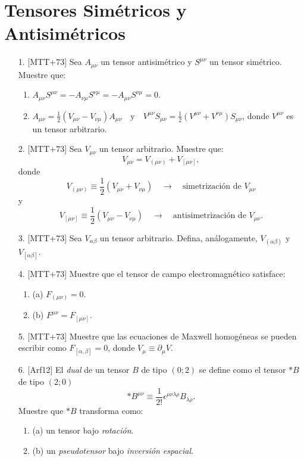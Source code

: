 \documentclass[a4paper,12pt]{article}
\begin{document}
\section*{Tensores Simétricos y Antisimétricos}

\begin{enumerate}
    \item [1.] [MTT+73] Sea $A_{\mu\nu}$ un tensor antisimétrico y $S^{\mu\nu}$ un tensor simétrico. Muestre que:
    \begin{enumerate}
        \item $A_{\mu\nu} S^{\mu\nu} = -A_{\nu\mu} S^{\nu\mu} = -A_{\mu\nu} S^{\nu\mu} = 0$.
        \item $A_{\mu\nu} = \frac{1}{2} (V_{\mu\nu} - V_{\nu\mu}) A_{\mu\nu} \quad \text{y} \quad V^{\mu\nu} S_{\mu\nu} = \frac{1}{2} (V^{\mu\nu} + V^{\nu\mu}) S_{\mu\nu}$, donde $V^{\mu\nu}$ es un tensor arbitrario.
    \end{enumerate}

    \item [2.] [MTT+73] Sea $V_{\mu\nu}$ un tensor arbitrario. Muestre que:
    $$
    V_{\mu\nu} = V_{(\mu\nu)} + V_{[\mu\nu]},
    $$
    donde
    $$
    V_{(\mu\nu)} \equiv \frac{1}{2} (V_{\mu\nu} + V_{\nu\mu}) \quad \rightarrow \quad \text{simetrización de } V_{\mu\nu}
    $$
    y
    $$
    V_{[\mu\nu]} \equiv \frac{1}{2} (V_{\mu\nu} - V_{\nu\mu}) \quad \rightarrow \quad \text{antisimetrización de } V_{\mu\nu}.
    $$

    \item [3.] [MTT+73] Sea $V_{\alpha\beta}$ un tensor arbitrario. Defina, análogamente, $V_{(\alpha\beta)}$ y $V_{[\alpha\beta]}$.

    \item [4.] [MTT+73] Muestre que el tensor de campo electromagnético satisface:
    \begin{enumerate}
        \item (a) $F_{(\mu\nu)} = 0$.
        \item (b) $F^{\mu\nu} = F_{[\mu\nu]}$.
    \end{enumerate}

    \item [5.] [MTT+73] Muestre que las ecuaciones de Maxwell homogéneas se pueden escribir como $F_{[\alpha,\beta]} = 0$, donde $V_{\mu} \equiv \partial_{\mu} V$.

    \item [6.] [Arf12] El \textit{dual} de un tensor $B$ de tipo $(0;2)$ se define como el tensor $*B$ de tipo $(2;0)$
    $$
    *B^{\mu\nu} \equiv \frac{1}{2!} \epsilon^{\mu\nu\lambda\rho} B_{\lambda\rho}.
    $$
    Muestre que $*B$ transforma como:
    \begin{enumerate}
        \item (a) un tensor bajo \textit{rotación}.
        \item (b) un \textit{pseudotensor} bajo \textit{inversión espacial}.
    \end{enumerate}
\end{enumerate}
\end{document}
